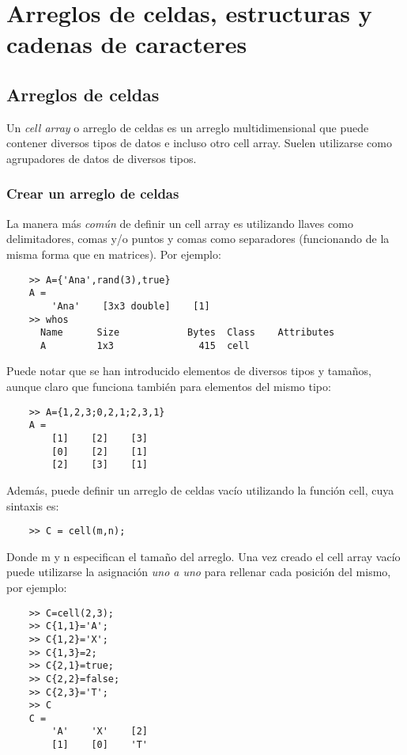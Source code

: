 \chapter{Arreglos de celdas, estructuras y cadenas de caracteres}

\section{Arreglos de celdas}

Un \textit{cell array}  o arreglo de celdas es un arreglo multidimensional que puede 
contener diversos tipos de datos e incluso otro cell array. Suelen utilizarse como agrupadores de datos de diversos tipos.

\subsection{Crear un arreglo de celdas}

La manera más \textit{común} de definir un cell array es utilizando llaves como delimitadores, 
comas y/o puntos y comas como separadores (funcionando de la misma forma que en matrices). 
Por ejemplo:

\begin{verbatim}
	>> A={'Ana',rand(3),true}
	A = 
	    'Ana'    [3x3 double]    [1]
	>> whos
	  Name      Size            Bytes  Class    Attributes
	  A         1x3               415  cell     
\end{verbatim}

Puede notar que se han introducido elementos de diversos tipos y tamaños, aunque claro que funciona 
también para elementos del mismo tipo:

\begin{verbatim}
	>> A={1,2,3;0,2,1;2,3,1}
	A = 
	    [1]    [2]    [3]
	    [0]    [2]    [1]
	    [2]    [3]    [1]
\end{verbatim}

Además, puede definir un arreglo de celdas vacío utilizando la función cell, cuya sintaxis es:

\begin{verbatim}
	>> C = cell(m,n);
\end{verbatim}

Donde m y n especifican el tamaño del arreglo. Una vez creado el cell array vacío puede utilizarse 
la asignación \textit{uno a uno} para rellenar cada posición del mismo, por ejemplo:

\begin{verbatim}
	>> C=cell(2,3);
	>> C{1,1}='A';
	>> C{1,2}='X';
	>> C{1,3}=2;
	>> C{2,1}=true;
	>> C{2,2}=false;
	>> C{2,3}='T';
	>> C
	C = 
	    'A'    'X'    [2]
	    [1]    [0]    'T'
\end{verbatim}

